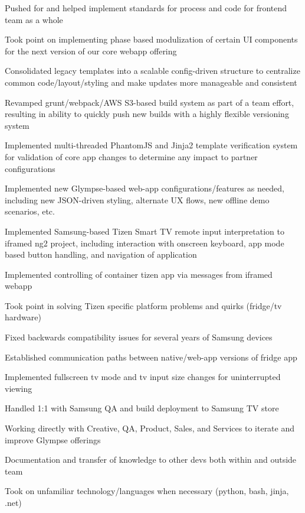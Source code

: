 \begin{cventries}
{\begin{cvitems}
        \item {Pushed for and helped implement standards for process and code for frontend team as a whole}
        \item {Took point on implementing phase based modulization of certain UI components for the next version of our core webapp offering}
        \item {Consolidated legacy templates into a scalable config-driven structure to centralize common code/layout/styling and make updates more manageable and consistent}
        \item {Revamped grunt/webpack/AWS S3-based build system as part of a team effort, resulting in ability to quickly push new builds with a highly flexible versioning system}
        \item {Implemented multi-threaded PhantomJS and Jinja2 template verification system for validation of core app changes to determine any impact to partner configurations}
        \item {Implemented new Glympse-based web-app configurations/features as needed, including new JSON-driven styling, alternate UX flows, new offline demo scenarios, etc.}
        \item {Implemented Samsung-based Tizen Smart TV remote input interpretation to iframed ng2 project, including interaction with onscreen keyboard, app mode based button handling, and navigation of application}
        \item {Implemented controlling of container tizen app via messages from iframed webapp}
        \item {Took point in solving Tizen specific platform problems and quirks (fridge/tv hardware)}
        \item {Fixed backwards compatibility issues for several years of Samsung devices}
        \item {Established communication paths between native/web-app versions of fridge app}
        \item {Implemented fullscreen tv mode and tv input size changes for uninterrupted viewing}
        \item {Handled 1:1 with Samsung QA and build deployment to Samsung TV store}
        \item {Working directly with Creative, QA, Product, Sales, and Services to iterate and improve Glympse offerings}
        \item {Documentation and transfer of knowledge to other devs both within and outside team}
        \item {Took on unfamiliar technology/languages when necessary (python, bash, jinja, .net)}
      \end{cvitems}
    }


\end{cventries}
